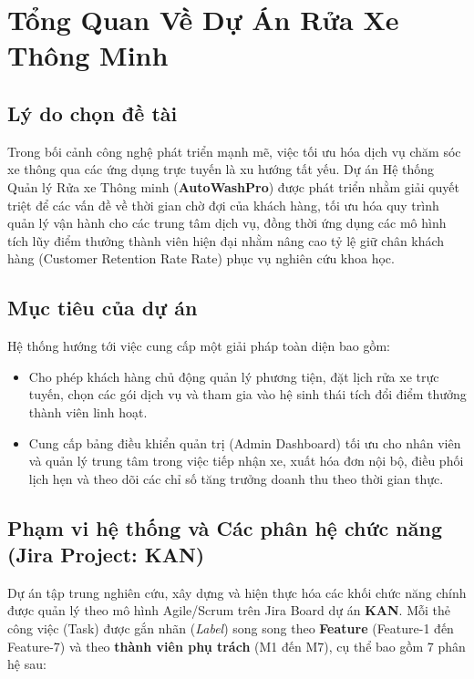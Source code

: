 \chapter{Tổng Quan Về Dự Án Rửa Xe Thông Minh}

\section{Lý do chọn đề tài}
Trong bối cảnh công nghệ phát triển mạnh mẽ, việc tối ưu hóa dịch vụ chăm sóc xe thông qua các ứng dụng trực tuyến là xu hướng tất yếu. Dự án Hệ thống Quản lý Rửa xe Thông minh (\textbf{AutoWashPro}) được phát triển nhằm giải quyết triệt để các vấn đề về thời gian chờ đợi của khách hàng, tối ưu hóa quy trình quản lý vận hành cho các trung tâm dịch vụ, đồng thời ứng dụng các mô hình tích lũy điểm thưởng thành viên hiện đại nhằm nâng cao tỷ lệ giữ chân khách hàng (Customer Retention Rate Rate) phục vụ nghiên cứu khoa học.

\section{Mục tiêu của dự án}
Hệ thống hướng tới việc cung cấp một giải pháp toàn diện bao gồm:
\begin{itemize}
    \item Cho phép khách hàng chủ động quản lý phương tiện, đặt lịch rửa xe trực tuyến, chọn các gói dịch vụ và tham gia vào hệ sinh thái tích đổi điểm thưởng thành viên linh hoạt.
    \item Cung cấp bảng điều khiển quản trị (Admin Dashboard) tối ưu cho nhân viên và quản lý trung tâm trong việc tiếp nhận xe, xuất hóa đơn nội bộ, điều phối lịch hẹn và theo dõi các chỉ số tăng trưởng doanh thu theo thời gian thực.
\end{itemize}

\section{Phạm vi hệ thống và Các phân hệ chức năng (Jira Project: KAN)}
Dự án tập trung nghiên cứu, xây dựng và hiện thực hóa các khối chức năng chính được quản lý theo mô hình Agile/Scrum trên Jira Board dự án \textbf{KAN}. Mỗi thẻ công việc (Task) được gắn nhãn (\textit{Label}) song song theo \textbf{Feature} (Feature-1 đến Feature-7) và theo \textbf{thành viên phụ trách} (M1 đến M7), cụ thể bao gồm 7 phân hệ sau:

